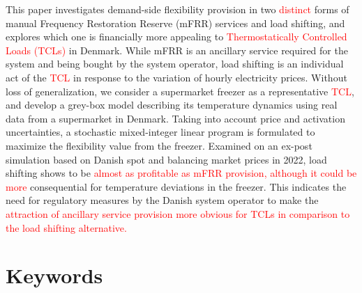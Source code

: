 \documentclass[11pt,a4paper]{article}
\begin{document}
This paper investigates %
demand-side flexibility provision in two  \textcolor{red}{distinct} forms of manual Frequency Restoration Reserve (mFRR) services and load shifting, and explores which one is financially more appealing to \textcolor{red}{Thermostatically Controlled Loads (TCLs)} in Denmark. While mFRR is an ancillary service required for the system and being bought by the system operator, load shifting is an individual act of the \textcolor{red}{TCL} in response to the variation of hourly electricity prices.  %
Without loss of generalization, we consider a supermarket freezer  as a representative \textcolor{red}{TCL}, and develop a grey-box model  describing its temperature dynamics using real data from a supermarket in Denmark. Taking into account price and activation uncertainties, a stochastic mixed-integer linear program is formulated to maximize the flexibility value from the freezer. %
%
%
Examined on an ex-post simulation based on  Danish spot and balancing market prices in 2022, load shifting shows to be \textcolor{red}{almost as profitable as mFRR provision, although it could  be more} consequential for temperature deviations in the freezer. This indicates the need for regulatory measures by the Danish  system operator to make the \textcolor{red}{attraction of ancillary service provision  more obvious for TCLs in comparison to the load shifting alternative.} 

\section*{Keywords}
\end{document}
